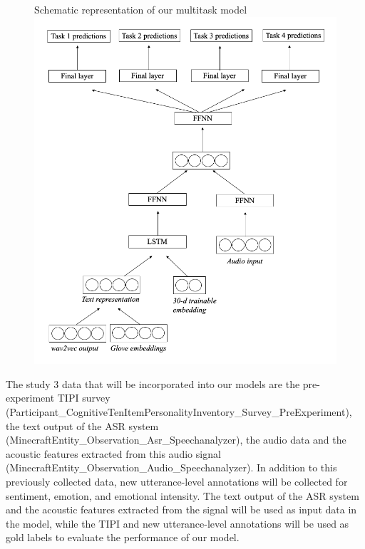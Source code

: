 \begin{figure}
    \begin{sidecaption}{Schematic representation of our multitask model}
    \centering
    \includegraphics[width=\textwidth]{images/sentiment_schematics_study3.png}
    \label{fig:sentiment_model_schematics}
    \end{sidecaption}
\end{figure}

The study 3 data that will be incorporated into our models are the
pre-experiment TIPI survey
(Participant\_CognitiveTenItemPersonalityInventory\_Survey\_PreExperiment),
the text output of the ASR system
(MinecraftEntity\_Observation\_Asr\_Speechanalyzer), the audio data and the
acoustic features extracted from this audio signal
(MinecraftEntity\_Observation\_Audio\_Speechanalyzer). In addition to this
previously collected data, new utterance-level annotations will be collected
for sentiment, emotion, and emotional intensity. The text output of the ASR
system and the acoustic features extracted from the signal will be used as
input data in the model, while the TIPI and new utterance-level annotations
will be used as gold labels to evaluate the performance of our model. 



